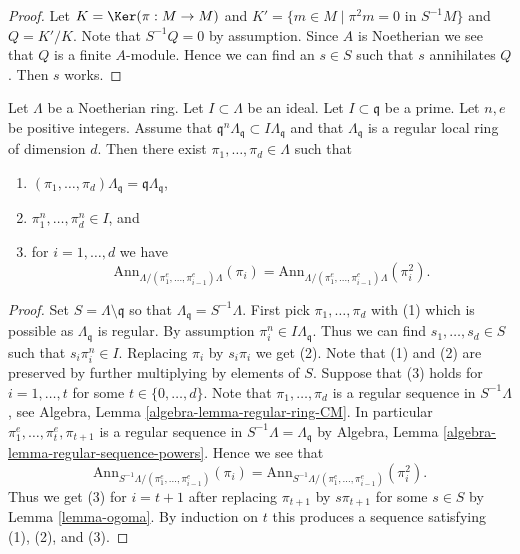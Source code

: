 \begin{proof}
Let $K = \Ker(\pi : M \to M)$ and
$K' = \{m \in M \mid \pi^2 m = 0\text{ in }S^{-1}M\}$ and
$Q = K'/K$. Note that $S^{-1}Q = 0$ by assumption. Since $A$
is Noetherian we see that $Q$ is a finite $A$-module.
Hence we can find an $s \in S$ such that $s$ annihilates $Q$.
Then $s$ works.
\end{proof}

\begin{lemma}
\label{lemma-find-sequence}
Let $\Lambda$ be a Noetherian ring. Let $I \subset \Lambda$ be an ideal.
Let $I \subset \mathfrak q$ be a prime. Let $n, e$ be positive integers.
Assume that $\mathfrak q^n\Lambda_\mathfrak q \subset I\Lambda_\mathfrak q$
and that $\Lambda_\mathfrak q$ is a regular local ring of dimension $d$.
Then there exist
$\pi_1, \ldots, \pi_d \in \Lambda$ such that
\begin{enumerate}
\item $(\pi_1, \ldots, \pi_d)\Lambda_\mathfrak q =
\mathfrak q\Lambda_\mathfrak q$,
\item $\pi_1^n, \ldots, \pi_d^n \in I$, and
\item for $i = 1, \ldots, d$ we have
$$
\text{Ann}_{\Lambda/(\pi_1^e, \ldots, \pi_{i - 1}^e)\Lambda}(\pi_i) =
\text{Ann}_{\Lambda/(\pi_1^e, \ldots, \pi_{i - 1}^e)\Lambda}(\pi_i^2).
$$
\end{enumerate}
\end{lemma}

\begin{proof}
Set $S = \Lambda \setminus \mathfrak q$ so that
$\Lambda_\mathfrak q = S^{-1}\Lambda$.
First pick $\pi_1, \ldots, \pi_d$ with (1) which is possible
as $\Lambda_\mathfrak q$ is regular. By assumption
$\pi_i^n \in I\Lambda_\mathfrak q$. Thus we can find
$s_1, \ldots, s_d \in S$ such that $s_i\pi_i^n \in I$.
Replacing $\pi_i$ by $s_i\pi_i$ we get (2).
Note that (1) and (2) are preserved by further multiplying by elements of $S$.
Suppose that (3) holds for $i = 1, \ldots, t$ for some
$t \in \{0, \ldots, d\}$. Note that
$\pi_1, \ldots, \pi_d$ is a regular sequence in $S^{-1}\Lambda$, see
Algebra, Lemma \ref{algebra-lemma-regular-ring-CM}.
In particular $\pi_1^e, \ldots, \pi_t^e, \pi_{t + 1}$ is a
regular sequence in $S^{-1}\Lambda = \Lambda_\mathfrak q$ by
Algebra, Lemma \ref{algebra-lemma-regular-sequence-powers}.
Hence we see that
$$
\text{Ann}_{S^{-1}\Lambda/(\pi_1^e, \ldots, \pi_{i - 1}^e)}(\pi_i) =
\text{Ann}_{S^{-1}\Lambda/(\pi_1^e, \ldots, \pi_{i - 1}^e)}(\pi_i^2).
$$
Thus we get (3) for $i = t + 1$ after replacing $\pi_{t + 1}$ by $s\pi_{t + 1}$
for some $s \in S$ by Lemma \ref{lemma-ogoma}. By induction on $t$ this
produces a sequence satisfying (1), (2), and (3).
\end{proof}

